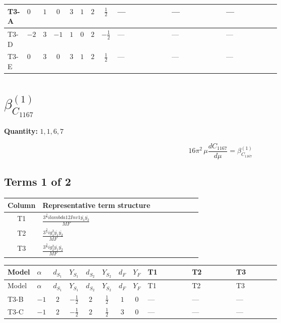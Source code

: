 \documentclass[8pt]{article}
\begin{document}
\begin{landscape}
\begin{longtable}{@{}llcccccc >{\raggedright\arraybackslash}p{0.21\linewidth} >{\raggedright\arraybackslash}p{0.21\linewidth} >{\raggedright\arraybackslash}p{0.21\linewidth}@{}}
\midrule
T3-A & $0$ & $1$ & $0$ & $3$ & $1$ & $2$ & $\frac{1}{2}$ & --- & --- & --- \\
\midrule
T3-D & $-2$ & $3$ & $-1$ & $1$ & $0$ & $2$ & $-\frac{1}{2}$ & --- & --- & --- \\
\midrule
T3-E & $0$ & $3$ & $0$ & $3$ & $1$ & $2$ & $\frac{1}{2}$ & --- & --- & --- \\
\midrule
\bottomrule
\end{longtable}
\clearpage
\section*{$\beta_{C_{1167}}^{(1)}$}
\noindent\textbf{Quantity: }$\mathrm{1,1,6,7}$\par\smallskip
\[16\pi^2\,\mu\frac{d C_{1167}}{d\mu}=\beta_{C_{1167}}^{(1)}\]
\subsection*{Terms 1 of 2}
\begin{center}
\begin{tabular}{@{}c >{\raggedright\arraybackslash}p{0.82\linewidth}@{}}
\toprule
Column & Representative term structure \\
\midrule
T1 & \(\displaystyle \frac{3^{\frac{3}{4}} i lambda12Inv1 \overline{y_{1}} \overline{y_{2}}}{MF}\) \\
\midrule
T2 & \(\displaystyle \frac{3^{\frac{3}{4}} i g_{1}^{2} \overline{y_{1}} \overline{y_{2}}}{MF}\) \\
\midrule
T3 & \(\displaystyle \frac{3^{\frac{3}{4}} i g_{2}^{2} \overline{y_{1}} \overline{y_{2}}}{MF}\) \\
\midrule
\bottomrule
\end{tabular}
\end{center}
\smallskip
\tiny
\begin{longtable}{@{}llcccccc >{\raggedright\arraybackslash}p{0.21\linewidth} >{\raggedright\arraybackslash}p{0.21\linewidth} >{\raggedright\arraybackslash}p{0.21\linewidth}@{}}
\toprule
Model & $\alpha$ & $d_{S_1}$ & $Y_{S_1}$ & $d_{S_2}$ & $Y_{S_2}$ & $d_F$ & $Y_F$ & T1 & T2 & T3 \\
\midrule
\endfirsthead
\toprule
Model & $\alpha$ & $d_{S_1}$ & $Y_{S_1}$ & $d_{S_2}$ & $Y_{S_2}$ & $d_F$ & $Y_F$ & T1 & T2 & T3 \\
\midrule
\endhead
T3-B & $-1$ & $2$ & $-\frac{1}{2}$ & $2$ & $\frac{1}{2}$ & $1$ & $0$ & --- & --- & --- \\
\midrule
T3-C & $-1$ & $2$ & $-\frac{1}{2}$ & $2$ & $\frac{1}{2}$ & $3$ & $0$ & --- & --- & --- \\

\end{longtable}
\end{landscape}
\end{document}
